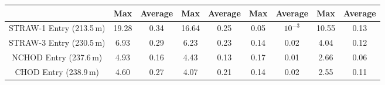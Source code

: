\documentclass[../../main.tex]{subfiles}
\begin{document}
\begin{table}[htbp]
{\begin{tabular}{|c|clclclcl|}
            \multicolumn{1}{|l|}{} & 
            \multicolumn{1}{c|}{\textbf{Max}} & \multicolumn{1}{c|}{\textbf{Average}} & 
            \multicolumn{1}{c|}{\textbf{Max}} & \multicolumn{1}{c|}{\textbf{Average}} & 
            \multicolumn{1}{c|}{\textbf{Max}} & \multicolumn{1}{c|}{\textbf{Average}} & 
            \multicolumn{1}{c|}{\textbf{Max}} & \textbf{Average} \\ \hline
            STRAW-1 Entry (213.5\,m) & \multicolumn{1}{c|}{19.28} & \multicolumn{1}{c|}{0.34} & \multicolumn{1}{c|}{16.64} & \multicolumn{1}{c|}{0.25} & \multicolumn{1}{c|}{0.05} & \multicolumn{1}{c|}{$10^{-3}$} & \multicolumn{1}{c|}{10.55} & \multicolumn{1}{c|}{0.13} \\ \hline
            STRAW-3 Entry (230.5\,m) & \multicolumn{1}{c|}{6.93} & \multicolumn{1}{c|}{0.29} & \multicolumn{1}{c|}{6.23} & \multicolumn{1}{c|}{0.23} & \multicolumn{1}{c|}{0.14} & \multicolumn{1}{c|}{0.02} & \multicolumn{1}{c|}{4.04} & \multicolumn{1}{c|}{0.12} \\ \hline
            NCHOD Entry (237.6\,m) & \multicolumn{1}{c|}{4.93} & \multicolumn{1}{c|}{0.16} & \multicolumn{1}{c|}{4.43} & \multicolumn{1}{c|}{0.13} & \multicolumn{1}{c|}{0.17} & \multicolumn{1}{c|}{0.01} & \multicolumn{1}{c|}{2.66} & \multicolumn{1}{c|}{0.06} \\ \hline
            CHOD Entry (238.9\,m) & \multicolumn{1}{c|}{4.60} & \multicolumn{1}{c|}{0.27} & \multicolumn{1}{c|}{4.07} & \multicolumn{1}{c|}{0.21} & \multicolumn{1}{c|}{0.14} & \multicolumn{1}{c|}{0.02} & \multicolumn{1}{c|}{2.55} & \multicolumn{1}{c|}{0.11} \\ \hline

\end{tabular}}
\end{table}
\end{document}
